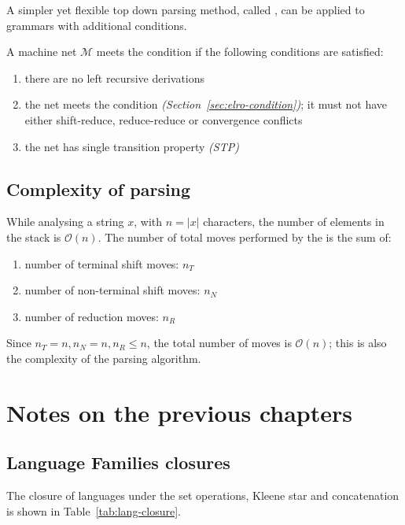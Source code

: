 \documentclass[english]{article}
\begin{document}
A simpler yet flexible top down parsing method, called \ELLo, can be applied to \ELRo grammars with additional conditions.

A machine net \(\mathcal{M}\) meets the \ELLo condition if the following conditions are satisfied:

\begin{enumerate}
  \item there are no left recursive derivations
  \item the net meets the \ELRo condition \textit{(Section~\ref{sec:elro-condition})}; it must not have either shift-reduce, reduce-reduce or convergence conflicts
  \item the net has single transition property \textit{(STP)}
\end{enumerate}

\subsection{Complexity of parsing}

While analysing a string \(x\), with \(n = |x|\) characters, the number of elements in the stack is \(\mathcal{O}(n)\).
The number of total moves performed by the \PDA is the sum of:

\begin{enumerate}
  \item number of terminal shift moves: \(n_T\)
  \item number of non-terminal shift moves: \(n_N\)
  \item number of reduction moves: \(n_R\)
\end{enumerate}

Since \(n_T = n, n_N = n, n_R \leq n\), the total number of moves is \(\mathcal{O}(n)\);
this is also the complexity of the parsing algorithm.

\clearpage

\section{Notes on the previous chapters}

\subsection{Language Families closures}

The closure of languages under the set operations, Kleene star and concatenation is shown in Table~\ref{tab:lang-closure}.
\end{document}
